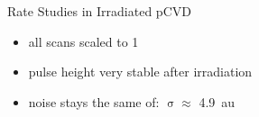 \begin{frame}{Rate Studies in Irradiated pCVD}

	\vspace*{-15pt}
	
	\begin{itemize}
		\itemfill
		\item all scans scaled to 1
		\item pulse height very stable after irradiation
		\item noise stays the same of: $\upsigma \approx$ \SI{4.9}{au}
	\end{itemize}

\end{frame}